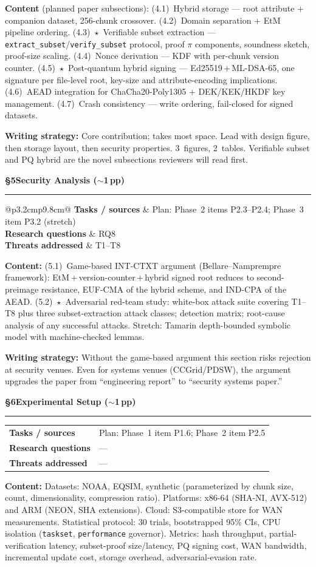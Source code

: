 \documentclass[11pt]{article}
\makeatletter
\newcommand{\mapsec}[3]{%
  \smallskip\noindent
  \begin{tabular}{@{}p{3.2cm}p{9.8cm}@{}}
  \toprule
  \textbf{Tasks / sources}    & #1 \\
  \textbf{Research questions} & #2 \\
  \textbf{Threats addressed}  & #3 \\
  \bottomrule
  \end{tabular}\smallskip}
\makeatother
\begin{document}
\noindent\textbf{Content} (planned paper subsections):
(4.1)~Hybrid storage --- root attribute + companion dataset, 256-chunk crossover.
(4.2)~Domain separation + EtM pipeline ordering.
(4.3)~$\star$~Verifiable subset extraction --- \texttt{extract\_subset}/\texttt{verify\_subset}
protocol, proof $\pi$ components, soundness sketch, proof-size scaling.
(4.4)~Nonce derivation --- KDF with per-chunk version counter.
(4.5)~$\star$~Post-quantum hybrid signing --- Ed25519\,$+$\,ML-DSA-65, one signature per
file-level root, key-size and attribute-encoding implications.
(4.6)~AEAD integration for ChaCha20-Poly1305 + DEK/KEK/HKDF key management.
(4.7)~Crash consistency --- write ordering, fail-closed for signed datasets.

\noindent\textbf{Writing strategy:} Core contribution; takes most space. Lead with design
figure, then storage layout, then security properties. 3~figures, 2~tables.
Verifiable subset and PQ hybrid are the novel subsections reviewers will read first.

\bigskip
\noindent\textcolor{blue!60!black}{\textbf{\S5\quad Security Analysis \hfill($\sim$1\,pp)}}
\par\noindent\rule{\linewidth}{0.4pt}
\mapsec{Plan: Phase~2 items P2.3--P2.4; Phase~3 item P3.2 (stretch)}{RQ8}{T1--T8}

\noindent\textbf{Content:}
(5.1)~Game-based INT-CTXT argument (Bellare--Namprempre framework):
EtM\,$+$\,version-counter\,$+$\,hybrid signed root reduces to second-preimage
resistance, EUF-CMA of the hybrid scheme, and IND-CPA of the AEAD.
(5.2)~$\star$~Adversarial red-team study: white-box attack suite covering T1--T8 plus
three subset-extraction attack classes; detection matrix; root-cause analysis of any
successful attacks.
Stretch: Tamarin depth-bounded symbolic model with machine-checked lemmas.

\noindent\textbf{Writing strategy:} Without the game-based argument this section risks
rejection at security venues. Even for systems venues (CCGrid/PDSW), the argument
upgrades the paper from ``engineering report'' to ``security systems paper.''

\bigskip
\noindent\textcolor{blue!60!black}{\textbf{\S6\quad Experimental Setup \hfill($\sim$1\,pp)}}
\par\noindent\rule{\linewidth}{0.4pt}
\mapsec{Plan: Phase~1 item P1.6; Phase~2 item P2.5}{---}{---}

\noindent\textbf{Content:} Datasets: NOAA, EQSIM, synthetic (parameterized by chunk
size, count, dimensionality, compression ratio). Platforms: x86-64 (SHA-NI, AVX-512)
and ARM (NEON, SHA extensions). Cloud: S3-compatible store for WAN measurements.
Statistical protocol: 30 trials, bootstrapped 95\% CIs, CPU isolation (\texttt{taskset},
\texttt{performance} governor). Metrics: hash throughput, partial-verification latency,
subset-proof size/latency, PQ signing cost, WAN bandwidth, incremental update cost,
storage overhead, adversarial-evasion rate.
\end{document}
